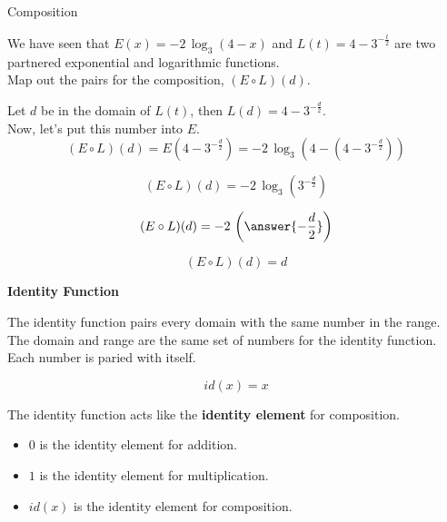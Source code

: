 \documentclass{ximera}
\begin{document}
\begin{example}  Composition

We have seen that $E(x) = -2 \, \log_3(4-x)$ and $L(t) = 4 - 3^{-\frac{t}{2}}$ are two partnered exponential and logarithmic functions. \\



Map out the pairs for the composition, $(E \circ L)(d)$.

\begin{explanation}



Let $d$ be in the domain of $L(t)$, then $L(d) = 4 - 3^{-\frac{d}{2}}$. \\

Now, let's put this number into $E$. \\



\[    (E \circ L)(d)  =  E(4 - 3^{-\frac{d}{2}}) = -2 \, \log_3(4 - (4 - 3^{-\frac{d}{2}}))            \]


\[    (E \circ L)(d)  =  -2 \, \log_3( 3^{-\frac{d}{2}})              \]


\[    (E \circ L)(d)  = -2 \, \left( \answer{-\frac{d}{2}} \right)              \]


\[    (E \circ L)(d)  = d            \]

\end{explanation}
\end{example}







\begin{definition} \textbf{\textcolor{green!50!black}{Identity Function}}


The identity function pairs every domain with the same number in the range. \\

The domain and range are the same set of numbers for the identity function.  Each number is paried with itself.


\[
id(x) = x
\]


\end{definition}




The identity function acts like the \textbf{identity element} for composition. \\


\begin{itemize}
	\item $0$ is the identity element for addition. \\
	\item $1$ is the identity element for multiplication. \\
	\item $id(x)$ is the identity element for composition.
\end{itemize}
\end{document}
